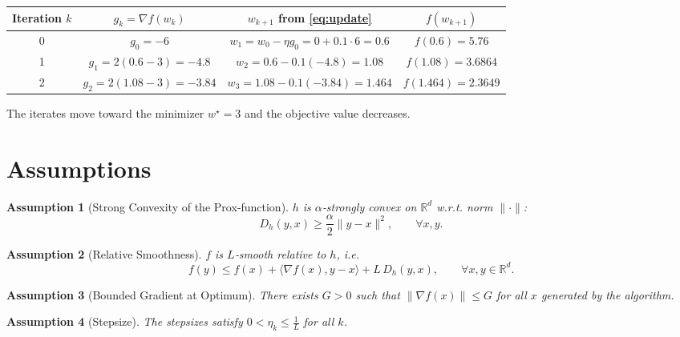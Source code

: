 \documentclass{article}
\newtheorem{assumption}{Assumption}
\newcommand{\inner}[2]{\langle #1,#2\rangle}
\newcommand{\Breg}[2]{D_h(#1,#2)}
\newcommand{\grad}[1]{\nabla #1}
\begin{document}
\begin{center}
\begin{tabular}{c|c|c|c}
Iteration $k$ & $g_k=\grad{f}(w_k)$ & $w_{k+1}$ from \eqref{eq:update} & $f(w_{k+1})$\\\hline
0 & $g_0= -6$ & $w_{1}= w_{0}-\eta g_0 =0+0.1\cdot6 =0.6$ & $f(0.6)=5.76$\\
1 & $g_1=2(0.6-3)=-4.8$ & $w_{2}=0.6-0.1(-4.8)=1.08$ & $f(1.08)=3.6864$\\
2 & $g_2=2(1.08-3)=-3.84$ & $w_{3}=1.08-0.1(-3.84)=1.464$ & $f(1.464)=2.3649$
\end{tabular}
\end{center}
The iterates move toward the minimizer $w^{\star}=3$ and the objective value decreases.

\newpage
\section*{Assumptions}
\begin{assumption}[Strong Convexity of the Prox‑function]\label{ass:strong}
$h$ is $\alpha$‑strongly convex on $\mathbb{R}^{d}$ w.r.t. norm $\|\cdot\|$:
\[
\Breg{y}{x}\ge\frac{\alpha}{2}\|y-x\|^{2},\qquad\forall x,y.
\]
\end{assumption}

\begin{assumption}[Relative Smoothness]\label{ass:rel-smooth}
$f$ is $L$‑smooth \emph{relative} to $h$, i.e.
\[
f(y)\le f(x)+\inner{\grad{f}(x)}{y-x}+L\,\Breg{y}{x},
\qquad\forall x,y\in\mathbb{R}^{d}.
\]
\end{assumption}

\begin{assumption}[Bounded Gradient at Optimum]\label{ass:bound}
There exists $G>0$ such that $\|\grad{f}(x)\|\le G$ for all $x$ generated by the algorithm.
\end{assumption}

\begin{assumption}[Stepsize]\label{ass:stepsize}
The stepsizes satisfy $0<\eta_k\le \frac{1}{L}$ for all $k$.
\end{assumption}
\end{document}
